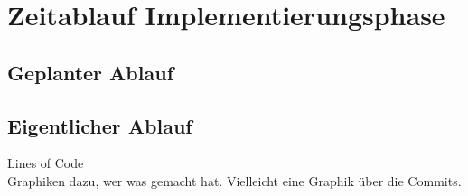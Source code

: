 \documentclass[a4paper]{scrreprt}
\begin{document}
\chapter{Zeitablauf Implementierungsphase}

\section{Geplanter Ablauf}
\section{Eigentlicher Ablauf}
Lines of Code\\
Graphiken dazu, wer was gemacht hat.
Vielleicht eine Graphik über die Commits.
\end{document}
